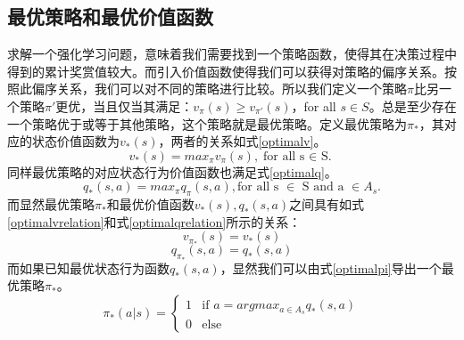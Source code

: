 \documentclass{standalone}
\begin{document}
\subsection{最优策略和最优价值函数}
求解一个强化学习问题，意味着我们需要找到一个策略函数，使得其在决策过程中得到的累计奖赏值较大。而引入价值函数使得我们可以获得对策略的偏序关系。按照此偏序关系，我们可以对不同的策略进行比较。所以我们定义一个策略$\pi$比另一个策略$\pi'$更优，当且仅当其满足：$v_{\pi}(s) \geq v_{\pi'}(s)$，for all $s \in S$。总是至少存在一个策略优于或等于其他策略，这个策略就是最优策略。定义最优策略为$\pi_{*}$，其对应的状态价值函数为$v_{*}(s)$，两者的关系如式\ref{optimalv}。
    \begin{equation}
    \label{optimalv}
        v_{*}(s) = max_{\pi}v_{\pi}(s),
        \mbox{for all s $\in$ S.}
    \end{equation}
同样最优策略的对应状态行为价值函数也满足式\ref{optimalq}。
    \begin{equation}
    \label{optimalq}
        q_{*}(s, a) = max_{\pi}q_{\pi}(s, a),
        \mbox{for all s $\in$ S and a $\in A_s$.}
    \end{equation}
而显然最优策略$\pi_{*}$和最优价值函数$v_{*}(s), q_{*}(s, a)$之间具有如式\ref{optimalvrelation}和式\ref{optimalqrelation}所示的关系：
    \begin{equation}
    \label{optimalvrelation}
        v_{\pi_*}(s) = v_{*}(s)
    \end{equation}
    \begin{equation}
    \label{optimalqrelation}
        q_{\pi_*}(s, a) = q_{*}(s, a)
    \end{equation}
而如果已知最优状态行为函数$q_{*}(s, a)$，显然我们可以由式\ref{optimalpi}导出一个最优策略$\pi_{*}$。
    \begin{equation}
    \label{optimalpi}
    \pi_{*}(a|s) = \begin{cases}
    1 &\mbox{if $a = argmax_{a \in A_s}q_{*}(s, a)$}\\
    0 &\mbox{else}
    \end{cases}
    \end{equation}
\end{document}
